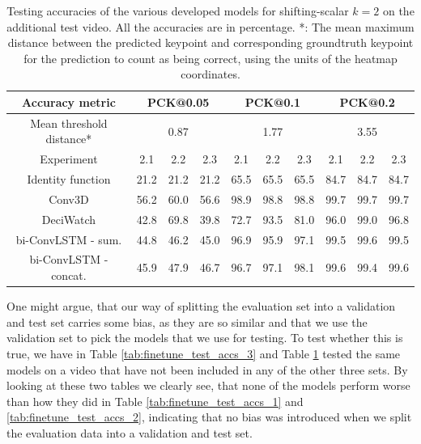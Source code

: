 \documentclass[./main.tex]{subfiles}
\begin{document}
\begin{table}[htbp]
    \begin{tabular}{c||ccc|ccc|ccc}
        \hline
        Accuracy metric & \multicolumn{3}{c}{PCK@0.05} & \multicolumn{3}{c}{PCK@0.1} & \multicolumn{3}{c}{PCK@0.2} \\
        \hline
        Mean threshold distance* & \multicolumn{3}{c}{0.87} & \multicolumn{3}{c}{1.77} & \multicolumn{3}{c}{3.55} \\
        \hline
        Experiment & 2.1 & 2.2 & 2.3 & 2.1 & 2.2 & 2.3 & 2.1 & 2.2 & 2.3 \\
        \hline
        \hline
        Identity function & 21.2 & 21.2 & 21.2 & 65.5 & 65.5 & 65.5 & 84.7 & 84.7 & 84.7 \\
        Conv3D & 56.2 & 60.0 & 56.6 & 98.9 & 98.8 & 98.8 & 99.7 & 99.7 & 99.7 \\
        DeciWatch & 42.8 & 69.8 & 39.8 & 72.7 & 93.5 & 81.0 & 96.0 & 99.0 & 96.8 \\
        bi-ConvLSTM - sum. & 44.8 & 46.2 & 45.0 & 96.9 & 95.9 & 97.1 & 99.5 & 99.6 & 99.5 \\
        bi-ConvLSTM - concat. & 45.9 & 47.9 & 46.7 & 96.7 & 97.1 & 98.1 & 99.6 & 99.4 & 99.6 \\
        \hline
    \end{tabular}
    \caption{Testing accuracies of the various developed models for shifting-scalar $k = 2$ on the additional test video. All the accuracies are in percentage. *: The mean maximum distance between the predicted keypoint and corresponding groundtruth keypoint for the prediction to count as being correct, using the units of the heatmap coordinates.}
    \label{tab:finetune_test_accs_4}
\end{table}

One might argue, that our way of splitting the evaluation set into a validation and test set carries some bias, as they are so similar and that we use the validation set to pick the models that we use for testing. To test whether this is true, we have in Table \ref{tab:finetune_test_accs_3} and Table \ref{tab:finetune_test_accs_4} tested the same models on a video that have not been included in any of the other three sets. By looking at these two tables we clearly see, that none of the models perform worse than how they did in Table \ref{tab:finetune_test_accs_1} and \ref{tab:finetune_test_accs_2}, indicating that no bias was introduced when we split the evaluation data into a validation and test set.
\end{document}
